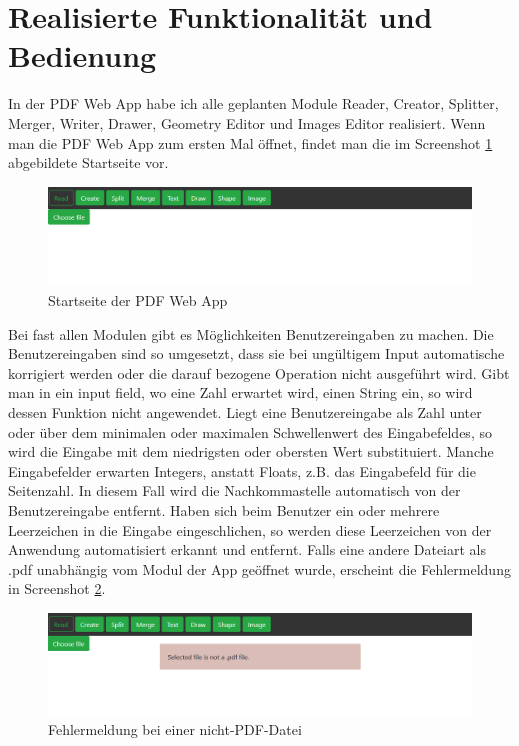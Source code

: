 \section{Realisierte Funktionalität und Bedienung}
In der PDF Web App habe ich alle geplanten Module Reader, Creator, Splitter, Merger, Writer, Drawer, Geometry Editor und Images Editor realisiert. Wenn man die PDF Web App zum ersten Mal öffnet, findet man die im Screenshot \ref{fig:start} abgebildete Startseite vor.

\begin{figure}[!htbp]
	\centering
	\includegraphics[width=1\textwidth]{"images/startseite.png"}
	\caption{Startseite der PDF Web App}
	\label{fig:start}
\end{figure}

Bei fast allen Modulen gibt es Möglichkeiten Benutzereingaben zu machen. Die Benutzereingaben sind so umgesetzt, dass sie bei ungültigem Input automatische korrigiert werden oder die darauf bezogene Operation nicht ausgeführt wird. Gibt man in ein input field, wo eine Zahl erwartet wird, einen String ein, so wird dessen Funktion nicht angewendet. Liegt eine Benutzereingabe als Zahl unter oder über dem minimalen oder maximalen Schwellenwert des Eingabefeldes, so wird die Eingabe mit dem niedrigsten oder obersten Wert substituiert. Manche Eingabefelder erwarten Integers, anstatt Floats, z.B. das Eingabefeld für die Seitenzahl. In diesem Fall wird die Nachkommastelle automatisch von der Benutzereingabe entfernt. Haben sich beim Benutzer ein oder mehrere Leerzeichen in die Eingabe eingeschlichen, so werden diese Leerzeichen von der Anwendung automatisiert erkannt und entfernt. Falls eine andere Dateiart als .pdf unabhängig vom Modul der App geöffnet wurde, erscheint die Fehlermeldung in Screenshot \ref{fig:errorfile}. 

\begin{figure}[!htbp]
	\centering
	\includegraphics[width=1\textwidth]{"images/errorfile.png"}
	\caption{Fehlermeldung bei einer nicht-PDF-Datei}
	\label{fig:errorfile}
\end{figure}

